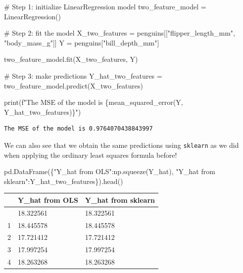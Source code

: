 \documentclass[
  letterpaper,
  DIV=11,
  numbers=noendperiod]{scrreprt}
\newenvironment{Shaded}{\begin{snugshade}}{\end{snugshade}}
\newcommand{\BuiltInTok}[1]{\textcolor[rgb]{0.00,0.23,0.31}{#1}}
\newcommand{\CommentTok}[1]{\textcolor[rgb]{0.37,0.37,0.37}{#1}}
\newcommand{\NormalTok}[1]{\textcolor[rgb]{0.00,0.23,0.31}{#1}}
\newcommand{\OperatorTok}[1]{\textcolor[rgb]{0.37,0.37,0.37}{#1}}
\newcommand{\SpecialCharTok}[1]{\textcolor[rgb]{0.37,0.37,0.37}{#1}}
\newcommand{\SpecialStringTok}[1]{\textcolor[rgb]{0.13,0.47,0.30}{#1}}
\newcommand{\StringTok}[1]{\textcolor[rgb]{0.13,0.47,0.30}{#1}}
\begin{document}
\begin{Shaded}
\begin{Highlighting}[]
\CommentTok{\# Step 1: initialize LinearRegression model}
\NormalTok{two\_feature\_model }\OperatorTok{=}\NormalTok{ LinearRegression()}

\CommentTok{\# Step 2: fit the model}
\NormalTok{X\_two\_features }\OperatorTok{=}\NormalTok{ penguins[[}\StringTok{"flipper\_length\_mm"}\NormalTok{, }\StringTok{"body\_mass\_g"}\NormalTok{]]}
\NormalTok{Y }\OperatorTok{=}\NormalTok{ penguins[}\StringTok{"bill\_depth\_mm"}\NormalTok{]}

\NormalTok{two\_feature\_model.fit(X\_two\_features, Y)}

\CommentTok{\# Step 3: make predictions}
\NormalTok{Y\_hat\_two\_features }\OperatorTok{=}\NormalTok{ two\_feature\_model.predict(X\_two\_features)}

\BuiltInTok{print}\NormalTok{(}\SpecialStringTok{f"The MSE of the model is }\SpecialCharTok{\{}\NormalTok{mean\_squared\_error(Y, Y\_hat\_two\_features)}\SpecialCharTok{\}}\SpecialStringTok{"}\NormalTok{)}
\end{Highlighting}
\end{Shaded}

\begin{verbatim}
The MSE of the model is 0.9764070438843997
\end{verbatim}

We can also see that we obtain the same predictions using
\texttt{sklearn} as we did when applying the ordinary least squares
formula before!

\begin{Shaded}
\begin{Highlighting}[]
\NormalTok{pd.DataFrame(\{}\StringTok{"Y\_hat from OLS"}\NormalTok{:np.squeeze(Y\_hat), }\StringTok{"Y\_hat from sklearn"}\NormalTok{:Y\_hat\_two\_features\}).head()}
\end{Highlighting}
\end{Shaded}

\begin{longtable}[]{@{}lll@{}}
\toprule\noalign{}
& Y\_hat from OLS & Y\_hat from sklearn \\
\midrule\noalign{}
\endhead
\bottomrule\noalign{}
\endlastfoot
0 & 18.322561 & 18.322561 \\
1 & 18.445578 & 18.445578 \\
2 & 17.721412 & 17.721412 \\
3 & 17.997254 & 17.997254 \\
4 & 18.263268 & 18.263268 \\
\end{longtable}
\end{document}
